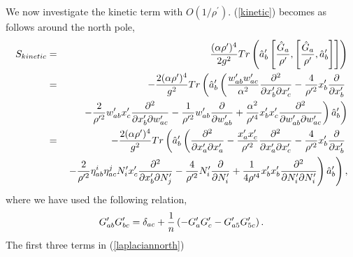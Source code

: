 \documentclass[a4paper,11pt]{article}
\begin{document}
We now investigate the kinetic term with $O(1/\rho^{\prime})$. 
(\ref{kinetic}) becomes as follows around the north pole, 
\begin{eqnarray} 
S_{kinetic}
&=&\frac{(\alpha\rho^{\prime})^{4}}{2g^{2}}
Tr\left(\hat{a}_{b}^{\prime}\left[\frac{\hat{G}_{a}}{\rho^{\prime}},
\left[\frac{\hat{G}_{a}}{\rho^{\prime}},\hat{a}_{b}^{\prime}
\right]\right]\right) \cr 
&=&-\frac{2(\alpha\rho^{\prime})^{4}}{g^{2}}
Tr\left(\hat{a}_{b}^{\prime}
\left(\frac{w_{ab}^{\prime}w_{ac}^{\prime}}{\alpha^{2}}
\frac{\partial^{2} }
{\partial x_{b}^{\prime}\partial x_{c}^{\prime}}
-\frac{4}{\rho^{\prime 2}}x_{b}^{\prime}
\frac{\partial}{\partial x_{b}^{\prime}}
\right. 
\right.\cr 
&& \left. \left.
-\frac{2}{\rho^{\prime 2}}w_{ab}^{\prime}x_{c}^{\prime}
\frac{\partial^{2}}{\partial x_{b}^{\prime}
\partial w_{ac}^{\prime}} 
-\frac{1}{\rho^{\prime 2}}w_{ab}^{\prime}
\frac{\partial}{\partial w_{ab}^{\prime}}
+\frac{\alpha^{2}}{\rho^{\prime 4}}
x_{b}^{\prime}x_{c}^{\prime}
\frac{\partial^{2}}{\partial w_{ab}^{\prime} 
\partial w_{ac}^{\prime}}
\right) \hat{a}_{b}^{\prime} \right) \cr 
&=&-\frac{2(\alpha\rho^{\prime})^{4}}{g^{2}}
Tr\left(\hat{a}_{b}^{\prime}\left(
\frac{\partial^{2} }
{\partial x_{a}^{\prime}\partial x_{a}^{\prime}}
-\frac{x_{a}^{\prime}x_{c}^{\prime} }{\rho^{\prime 2}}
\frac{\partial^{2}}{\partial x_{a}^{\prime}
\partial x_{c}^{\prime}} 
-\frac{4}{\rho^{\prime 2}}x_{b}^{\prime}
\frac{\partial}{\partial x_{b}^{\prime}}
\right.\right. \cr 
&&\left.\left.
-\frac{2}{\rho^{\prime 2}}
\eta_{ab}^{i}\eta_{ac}^{j}
N_{i}^{\prime}x_{c}^{\prime}
\frac{\partial^{2}}
{\partial x_{b}^{\prime} \partial N_{j}^{\prime}}
-\frac{4}{\rho^{\prime 2}}N_{i}^{\prime}\frac{\partial}
{\partial N_{i}^{\prime}}
+\frac{1}{4\rho^{\prime 4}}x_{b}^{\prime}x_{b}^{\prime}
\frac{\partial^{2}}{\partial N_{i}^{\prime}\partial N_{i}^{\prime}}
\right)\hat{a}_{b}^{\prime}\right), 
\label{laplaciannorth}
\end{eqnarray} 
where we have used the following relation,  
\begin{eqnarray}
G_{ab}^{\prime}G_{bc}^{\prime}=\delta_{ac}
+\frac{1}{n}\left( -G_{a}^{\prime}G_{c}^{\prime}
-G_{a5}^{\prime}G_{5c}^{\prime} \right).  \cr 
\end{eqnarray}
The first three terms in (\ref{laplaciannorth})
\end{document}

